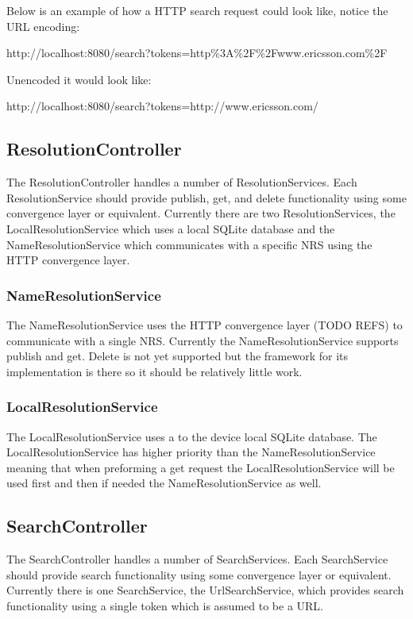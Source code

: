 Below is an example of how a HTTP search request could look like, notice the URL encoding:

http://localhost:8080/search?tokens=http\%3A\%2F\%2Fwww.ericsson.com\%2F

Unencoded it would look like:

http://localhost:8080/search?tokens=http://www.ericsson.com/

\subsection{ResolutionController}
\label{sec:ResolutionController}

The ResolutionController handles a number of ResolutionServices. Each ResolutionService should provide publish, get, and delete functionality using some convergence layer or equivalent. Currently there are two ResolutionServices, the LocalResolutionService which uses a local SQLite database and the NameResolutionService which communicates with a specific NRS using the HTTP convergence layer.

\subsubsection{NameResolutionService}

The NameResolutionService uses the HTTP convergence layer (TODO REFS) to communicate with a single NRS. Currently the NameResolutionService supports publish and get. Delete is not yet supported but the framework for its implementation is there so it should be relatively little work.

\subsubsection{LocalResolutionService}

The LocalResolutionService uses a to the device local SQLite database. The LocalResolutionService has higher priority than the NameResolutionService meaning that when preforming a get request the LocalResolutionService will be used first and then if needed the NameResolutionService as well.

\subsection{SearchController}
\label{sec:SearchController}

The SearchController handles a number of SearchServices. Each SearchService should provide search functionality 
using some convergence layer or equivalent. Currently there is one SearchService, the UrlSearchService, 
which provides search functionality using a single token which is assumed to be a URL.

